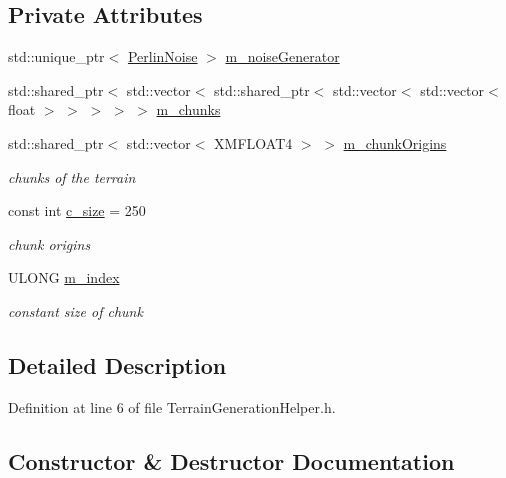 \subsection*{Private Attributes}
\begin{DoxyCompactItemize}
\item 
std\+::unique\+\_\+ptr$<$ \mbox{\hyperlink{class_perlin_noise}{Perlin\+Noise}} $>$ \mbox{\hyperlink{class_terrain_generation_helper_a2c9870bfe0dbf1a87a864562f28adc20}{m\+\_\+noise\+Generator}}
\item 
std\+::shared\+\_\+ptr$<$ std\+::vector$<$ std\+::shared\+\_\+ptr$<$ std\+::vector$<$ std\+::vector$<$ float $>$ $>$ $>$ $>$ $>$ \mbox{\hyperlink{class_terrain_generation_helper_ab5a4b915382e685454f5fe7f6081bc08}{m\+\_\+chunks}}
\item 
std\+::shared\+\_\+ptr$<$ std\+::vector$<$ X\+M\+F\+L\+O\+A\+T4 $>$ $>$ \mbox{\hyperlink{class_terrain_generation_helper_a54b02e81523e592c5f36646731cd5a68}{m\+\_\+chunk\+Origins}}
\begin{DoxyCompactList}\small\item\em chunks of the terrain \end{DoxyCompactList}\item 
const int \mbox{\hyperlink{class_terrain_generation_helper_a2e182f64a684cc0cf248f2f940cc36dc}{c\+\_\+size}} = 250
\begin{DoxyCompactList}\small\item\em chunk origins \end{DoxyCompactList}\item 
U\+L\+O\+NG \mbox{\hyperlink{class_terrain_generation_helper_a225a9ea3488c08d2565efee5461c4d00}{m\+\_\+index}}
\begin{DoxyCompactList}\small\item\em constant size of chunk \end{DoxyCompactList}\end{DoxyCompactItemize}


\subsection{Detailed Description}


Definition at line 6 of file Terrain\+Generation\+Helper.\+h.



\subsection{Constructor \& Destructor Documentation}
\mbox{\label{class_terrain_generation_helper_ab9eabdae4f687c9783698fe7e797d7b7}} 
